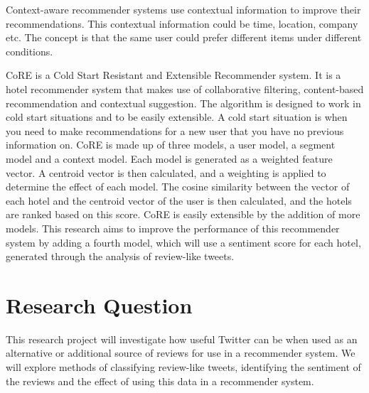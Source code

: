 Context-aware recommender systems use contextual information to improve their recommendations. This contextual information could be time, location, company etc. The concept is that the same user could prefer different items under different conditions.

CoRE \cite{core2019} is a Cold Start Resistant and Extensible Recommender system. It is a hotel recommender system that makes use of collaborative filtering, content-based recommendation and contextual suggestion. The algorithm is designed to work in cold start situations and to be easily extensible. A cold start situation is when you need to make recommendations for a new user that you have no previous information on. CoRE is made up of three models, a user model, a segment model and a context model. Each model is generated as a weighted feature vector. A centroid vector is then calculated, and a weighting is applied to determine the effect of each model. The cosine similarity between the vector of each hotel and the centroid vector of the user is then calculated, and the hotels are ranked based on this score.
CoRE is easily extensible by the addition of more models. This research aims to improve the performance of this recommender system by adding a fourth model, which will use a sentiment score for each hotel, generated through the analysis of review-like tweets. 

\section{Research Question}
This research project will investigate how useful Twitter can be when used as an alternative or additional source of reviews for use in a recommender system. We will explore methods of classifying review-like tweets, identifying the sentiment of the reviews and the effect of using this data in a recommender system.

